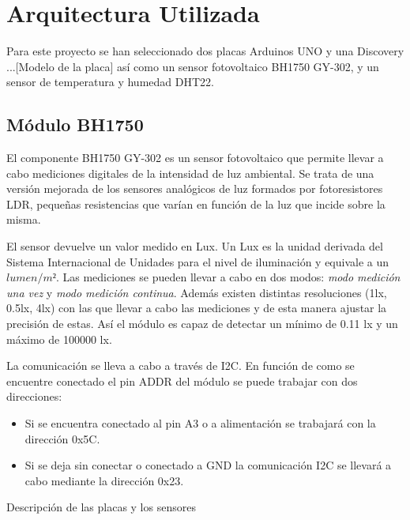 \section{Arquitectura Utilizada}\label{sec:arquitectura}

Para este proyecto se han seleccionado dos placas Arduinos UNO y una
Discovery ...[Modelo de la placa] así como un sensor fotovoltaico
BH1750 GY-302, y un sensor de temperatura y humedad DHT22.

\subsection{M\'odulo BH1750}
El componente BH1750 GY-302 es un sensor fotovoltaico que permite
llevar a cabo mediciones digitales de la intensidad de luz
ambiental. Se trata de una versi\'on mejorada de los sensores
anal\'ogicos de luz formados por fotoresistores LDR, pequeñas resistencias que
var\'ian en funci\'on de la luz que incide sobre la misma.

El sensor devuelve un valor medido en Lux. Un Lux es la unidad
derivada del Sistema Internacional de Unidades para el nivel de
iluminaci\'on y equivale a un $lumen/m²$. Las mediciones se pueden
llevar a cabo en dos modos: \emph{modo medici\'on una vez} y \emph{modo
  medici\'on continua}. Adem\'as existen distintas resoluciones (1lx,
0.5lx, 4lx) con
las que llevar a cabo las mediciones y de esta manera ajustar la
precisi\'on de estas. As\'i el m\'odulo es capaz de detectar un
m\'inimo de 0.11 lx y un m\'aximo de 100000 lx. 

La comunicaci\'on se lleva a cabo a través de I2C. En funci\'on de
como se encuentre conectado el pin ADDR del m\'odulo se puede trabajar
con dos direcciones:
\begin{itemize}
\item Si se encuentra conectado al pin A3 o a alimentaci\'on se
  trabajar\'a con la direcci\'on 0x5C.
\item Si se deja sin conectar o conectado a GND la comunicaci\'on I2C
  se llevar\'a a cabo mediante la direcci\'on 0x23.
\end{itemize}



Descripción de las placas y los sensores
